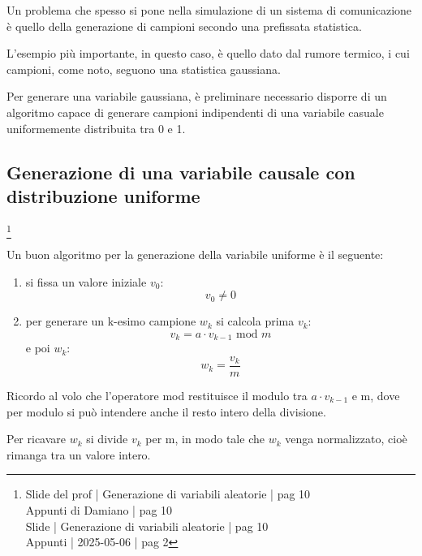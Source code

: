 Un problema che spesso si pone nella simulazione di un sistema di comunicazione è quello della generazione di campioni 
secondo una prefissata statistica. \newline 

L'esempio più importante, in questo caso, è quello dato dal rumore termico, 
i cui campioni, come noto, seguono una statistica gaussiana. \newline 

Per generare una variabile gaussiana, 
è preliminare necessario disporre di un algoritmo capace di generare campioni indipendenti di una variabile casuale 
uniformemente distribuita tra 0 e 1. \newline 

\newpage 

\subsection{Generazione di una variabile causale con distribuzione uniforme}
\footnote{Slide del prof | Generazione di variabili aleatorie | pag 10 \\
Appunti di Damiano | pag 10 \\ 
Slide | Generazione di variabili aleatorie | pag  10\\ 
Appunti | 2025-05-06 | pag 2
} 

Un buon algoritmo per la generazione della variabile uniforme è il seguente: 

\begin{enumerate}
    \item si fissa un valore iniziale $v_0$: 
    {
        \Large 
        \begin{equation}
            v_0 \neq 0
        \end{equation}
    }
    \item per generare un k-esimo campione $w_k$ si calcola prima $v_k$:
    {
        \Large 
        \begin{equation}
            v_k = a \cdot v_{k-1} \text{ mod } m
        \end{equation}
    }
    e poi $w_k$: 
    {
        \Large 
        \begin{equation}
            w_k = \frac{v_k}{m}
        \end{equation}
    }
\end{enumerate}

\begin{tcolorbox}
    Ricordo al volo che l'operatore mod restituisce il modulo tra $a \cdot v_{k-1}$ e m, 
    dove per modulo si può intendere anche il resto intero della divisione. \newline 
    
    Per ricavare $w_k$ si divide $v_k$ per m, in modo tale che $w_k$ venga normalizzato, 
    cioè rimanga tra un valore intero. 
\end{tcolorbox}

